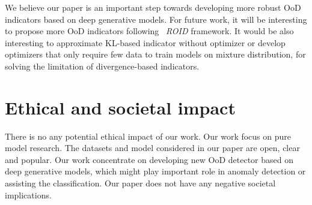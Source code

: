 \documentclass[letterpaper]{article} %
\newcommand{\ROID}{\textit{ROID}}
\begin{document}
 We believe our paper is an important step towards developing more robust OoD indicators based on deep generative models. For future work,  it will be interesting to propose more OoD indicators following ~\ROID{} framework. It would be also interesting to approximate KL-based indicator without optimizer or develop optimizers that only require few data to train models on mixture distribution, for solving the limitation of divergence-based indicators. 
 
 
\newpage
\section{Ethical and societal impact}
There is no any potential ethical impact of our work. Our work focus on pure model research. The datasets and model considered in our paper are open, clear and popular. Our work concentrate on developing new OoD detector based on deep generative models, which might play important role in anomaly detection or assisting the classification. Our paper does not have any negative societal implications.  

\end{document}
